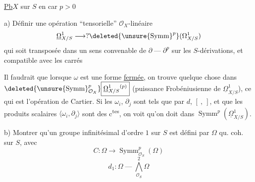 \uline{Pb}\qquad $X$ sur $S$ en car $p>0$

a) Définir une opération ``tensorielle''
$\mathcal O_X$-linéaire
\[
\underline\Omega^1_{X/S}\longrightarrow
?\deleted{\unsure{\operatorname{Symm}}^p}(\Omega^1_{X/S})
\]
qui soit transposée dans un sens convenable
de \deleted{$\unsure{\partial}$} $\partial\mathbin{\text{---}}\partial^p$
sur les $S$-dérivations, et compatible avec les carrés

Il faudrait que lorsque $\omega$ est une forme \uline{fermée},
on trouve quelque chose dans
$\deleted{\unsure{\operatorname{Symm}}^p_{\mathcal O_X}}\boxed{\underline\Omega^1_{X/S}{}^{(p)}}$
(puissance Frobéniusienne de $\underline\Omega^1_{X/S}$),
ce qui est l'opération de Cartier.
Si les $\omega_i$, $\partial_j$ sont tels que
 par $d$, $[\ ,\ ]$, et que
les produits scalaires $\langle\omega_i,\partial_j\rangle$ sont des c\textsuperscript{tes},
on voit qu'on doit  dans
$\boxed{\operatorname{Symm}^p(\underline\Omega^1_{X/S})}$.

b) Montrer qu'un groupe infinitésimal d'ordre $1$ sur $S$
est défini par $\Omega$ qu. coh. sur $S$, avec
\[
C:\Omega\longrightarrow\operatorname{Symm}_{\mathcal O_S}^p(\Omega)
\]
\[
d_1:\Omega\mathbin{\text{---}}\bigwedge_{\mathcal O_S}^2\Omega
\]
